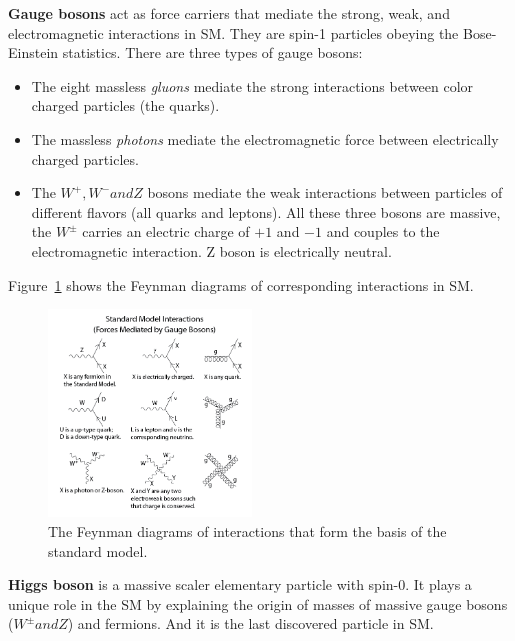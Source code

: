 \textbf{Gauge bosons}
act as force carriers that mediate the strong, weak, and electromagnetic interactions in SM.
They are spin-1 particles obeying the Bose-Einstein statistics. 
There are three types of gauge bosons:
\begin{itemize}
  \item The eight massless \textit{gluons} mediate the strong interactions between color charged particles (the quarks).
  \item The massless \textit{photons} mediate the electromagnetic force between electrically charged particles.
  \item The $W^{+}, W^{-} and Z$ bosons mediate the weak interactions between particles of different flavors (all quarks and leptons). All these three bosons are massive, the $W^{\pm}$ carries an electric charge of $+1$ and $−1$ and couples to the electromagnetic interaction. Z boson is electrically neutral.
\end{itemize}
Figure~\ref{fig:eleP-2} shows the Feynman diagrams of corresponding interactions in SM.
\begin{figure}[!htb]
  \centering
  \includegraphics[width=0.48\textwidth]{figures/Theory/Standard_Model_Feynman_Diagram_Vertices.png}
  \caption{The Feynman diagrams of interactions that form the basis of the standard model.}
  \label{fig:eleP-2}
\end{figure}

\textbf{Higgs boson}
is a massive scaler elementary particle with spin-0. 
It plays a unique role in the SM by explaining the origin of masses of massive gauge bosons ($W^{\pm} and Z$) and fermions. 
And it is the last discovered particle in SM.
